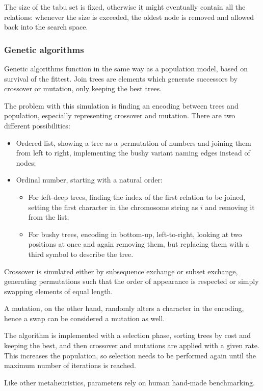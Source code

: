 The size of the tabu set is fixed, otherwise it might eventually contain all the relations: whenever the size is exceeded, the oldest node is removed and allowed back into the search space. 

\subsubsection{Genetic algorithms}
Genetic algorithms function in the same way as a population model, based on survival of the fittest. Join trees are elements which generate successors by crossover or mutation, only keeping the best trees.

The problem with this simulation is finding an encoding between trees and population, especially representing crossover and mutation. There are two different possibilities: 
\begin{itemize}
	\item Ordered list, showing a tree as a permutation of numbers and joining them from left to right, implementing the bushy variant naming edges instead of nodes;
	\item Ordinal number, starting with a natural order:
	\begin{itemize}
		\item For left-deep trees, finding the index of the first relation to be joined, setting the first character in the chromosome string as $i$ and removing it from the list;
		\item For bushy trees, encoding in bottom-up, left-to-right, looking at two positions at once and again removing them, but replacing them with a third symbol to describe the tree.
	\end{itemize}
\end{itemize}
Crossover is simulated either by subsequence exchange or subset exchange, generating permutations such that the order of appearance is respected or simply swapping elements of equal length.

A mutation, on the other hand, randomly alters a character in the encoding, hence a swap can be considered a mutation as well.

The algorithm is implemented with a selection phase, sorting trees by cost and keeping the best, and then crossover and mutations are applied with a given rate. This increases the population, so selection needs to be performed again until the maximum number of iterations is reached.

Like other metaheuristics, parameters rely on human hand-made benchmarking.
